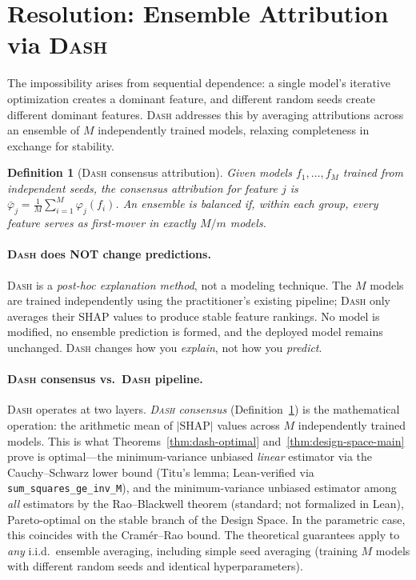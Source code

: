 \documentclass{article}
\newtheorem{definition}[theorem]{Definition}
\newcommand{\DASH}{\textsc{Dash}}
\begin{document}

\section{Resolution: Ensemble Attribution via \DASH}
\label{sec:resolution}

The impossibility arises from sequential dependence: a single model's iterative optimization creates a dominant feature, and different random seeds create different dominant features.
\DASH{} addresses this by averaging attributions across an ensemble of $M$ independently trained models, relaxing completeness in exchange for stability.

\begin{definition}[\DASH{} consensus attribution]
\label{def:dash}
Given models $f_1, \ldots, f_M$ trained from independent seeds, the \emph{consensus attribution} for feature $j$ is $\bar{\varphi}_j = \frac{1}{M} \sum_{i=1}^{M} \varphi_j(f_i)$.
An ensemble is \emph{balanced} if, within each group, every feature serves as first-mover in exactly $M/m$ models.
\end{definition}

\paragraph{\DASH{} does NOT change predictions.}
\DASH{} is a \emph{post-hoc explanation method}, not a modeling technique. The $M$ models are trained independently using the practitioner's existing pipeline; \DASH{} only averages their SHAP values to produce stable feature rankings. No model is modified, no ensemble prediction is formed, and the deployed model remains unchanged. \DASH{} changes how you \emph{explain}, not how you \emph{predict}.

\paragraph{\DASH{} consensus vs.\ \DASH{} pipeline.}
\DASH{} operates at two layers. \emph{\DASH{} consensus} (Definition~\ref{def:dash}) is the mathematical operation: the arithmetic mean of $|\text{SHAP}|$ values across $M$ independently trained models. This is what Theorems~\ref{thm:dash-optimal} and~\ref{thm:design-space-main} prove is optimal---the minimum-variance unbiased \emph{linear} estimator via the Cauchy--Schwarz lower bound (Titu's lemma; Lean-verified via \texttt{sum\_squares\_ge\_inv\_M}), and the minimum-variance unbiased estimator among \emph{all} estimators by the Rao--Blackwell theorem (standard; not formalized in Lean), Pareto-optimal on the stable branch of the Design Space. In the parametric case, this coincides with the Cram\'er--Rao bound. The theoretical guarantees apply to \emph{any} i.i.d.\ ensemble averaging, including simple seed averaging (training $M$ models with different random seeds and identical hyperparameters).
\end{document}
